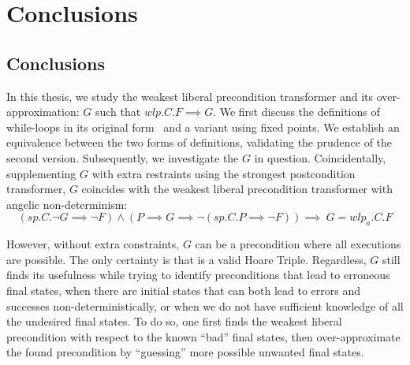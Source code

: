 \chapter{Conclusions}\label{ch:conclusion} %

\section{Conclusions}
In this thesis, we study the weakest liberal precondition transformer and its over-approximation: $G$ such that $wlp.C.F\implies G$. 
We first discuss the definitions of while-loops in its original form~\cite{dijkstra75} and a variant using fixed points. 
We establish an equivalence between the two forms of definitions, validating the prudence of the second version. 
Subsequently, we investigate the $G$ in question. 
Coincidentally, supplementing $G$ with extra restraints using the strongest postcondition transformer, $G$ coincides with the weakest liberal precondition transformer with angelic non-determinism: 
$$(sp.C.\neg G {\implies} \neg F) \wedge
(P{\implies} G \implies \neg(sp.C.P {\implies} \neg F) )
\implies\ G = wlp_a.C.F$$

However, without extra constraints, $G$ can be a precondition where all executions are possible. 
The only certainty is that  is a valid Hoare Triple. 
Regardless, $G$ still finds its usefulness while trying to identify preconditions that lead to erroneous final states, when there are initial states that can both lead to errors and successes non-deterministically, or when we do not have sufficient knowledge of all the undesired final states. 
To do so, one first finds the weakest liberal precondition with respect to the known ``bad'' final states, then over-approximate the found precondition by ``guessing'' more possible unwanted final states. 

